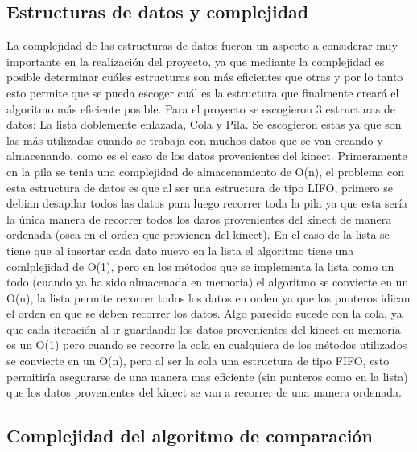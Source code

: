 \documentclass[letterpaper]{article}
\begin{document}
\subsection{Estructuras de datos y complejidad}
\quad \quad La complejidad de las estructuras de datos fueron un aspecto a considerar muy importante en la realización del proyecto, ya que mediante la complejidad es posible determinar cuáles estructuras son más eficientes que otras y por lo tanto esto permite que se pueda escoger cuál es la estructura que finalmente creará el algoritmo más eficiente posible. Para el proyecto se escogieron 3 estructuras de datos: La lista doblemente enlazada, Cola y Pila. Se escogieron estas ya que son las más utilizadas cuando se trabaja con muchos datos que se van creando y almacenando, como es el caso de los datos provenientes del kinect. Primeramente cn la pila se tenia una complejidad de almacenamiento de O(n), el problema con esta estructura de datos es que al ser una estructura de tipo LIFO, primero se debian desapilar todos las datos para luego recorrer toda la pila ya que esta sería la única manera de recorrer todos los daros provenientes del kinect de manera ordenada (osea en el orden que provienen del kinect). En el caso de la lista se tiene que al insertar cada dato nuevo en la lista el algoritmo tiene una comlplejidad de O(1), pero en los métodos que se implementa la lista como un todo (cuando ya ha sido almacenada en memoria) el algoritmo se convierte en un O(n), la lista permite recorrer todos los datos en orden ya que los punteros idican el orden en que se deben recorrer los datos. Algo parecido sucede con la cola, ya que cada iteración al ir guardando los datos provenientes del kinect en memoria es un O(1) pero cuando se recorre la cola en cualquiera de los métodos utilizados se convierte en un O(n), pero al ser la cola una estructura de tipo FIFO, esto permitiría asegurarse de una manera mas eficiente (sin punteros como en la lista) que los datos provenientes del kinect se van a recorrer de una manera ordenada.

\subsection{Complejidad del algoritmo de comparación}
\end{document}
